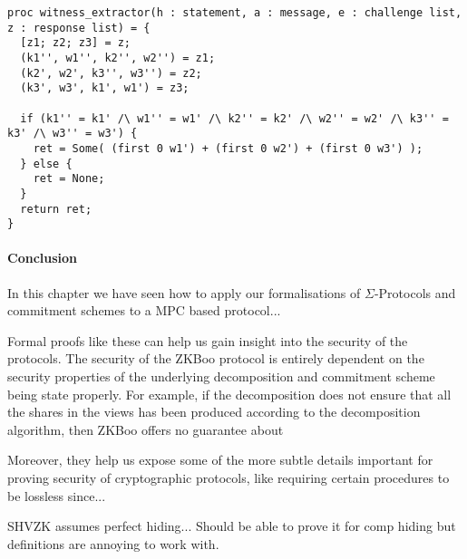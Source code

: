 \begin{lstlisting}[float,label=lst:zbkoo_extractor,caption= ZKBoo witness extractor]
proc witness_extractor(h : statement, a : message, e : challenge list, z : response list) = {
  [z1; z2; z3] = z;
  (k1'', w1'', k2'', w2'') = z1;
  (k2', w2', k3'', w3'') = z2;
  (k3', w3', k1', w1') = z3;

  if (k1'' = k1' /\ w1'' = w1' /\ k2'' = k2' /\ w2'' = w2' /\ k3'' = k3' /\ w3'' = w3') {
    ret = Some( (first 0 w1') + (first 0 w2') + (first 0 w3') );
  } else {
    ret = None;
  }
  return ret;
}
\end{lstlisting}



\paragraph{Conclusion}
In this chapter we have seen how to apply our formalisations of
$\Sigma$-Protocols and commitment schemes to a MPC based protocol...

Formal proofs like these can help us gain insight into the security of the
protocols. The security of the ZKBoo protocol is entirely dependent on the
security properties of the underlying decomposition and commitment scheme being
state properly. For example, if the decomposition does not ensure that all the
shares in the views has been produced according to the decomposition algorithm,
then ZKBoo offers no guarantee about

Moreover, they help us expose some of the more subtle details important for
proving security of cryptographic protocols, like requiring certain procedures
to be lossless since...

SHVZK assumes perfect hiding... Should be able to prove it for comp hiding but
definitions are annoying to work with.


